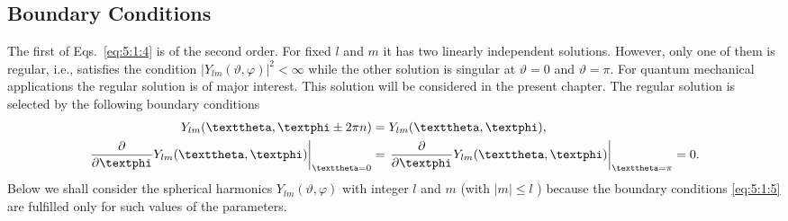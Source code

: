 \subsection{Boundary Conditions}\label{sec:5.1.3}
The first of Eqs.~\eqref{eq:5:1:4} is of the second order. For fixed $l$ and $m$ it has two linearly independent solutions. However, only one of them is regular, i.e., satisfies the condition $\left|Y_{l m}(\vartheta, \varphi)\right|^{2}<\infty$ while the other solution is singular at $\vartheta=0$ and $\vartheta=\pi$. For quantum mechanical applications the regular solution is of major interest. This solution will be considered in the present chapter. The regular solution is selected by the following boundary conditions
\begin{align}
Y_{l m}(\vartheta, \varphi \pm 2 \pi n) & =Y_{l m}(\vartheta, \varphi),  \notag\\
\left.\frac{\partial}{\partial \varphi} Y_{l m}(\vartheta, \varphi)\right|_{\vartheta=0} & =\left.\frac{\partial}{\partial \varphi} Y_{l m}(\vartheta, \varphi)\right|_{\vartheta=\pi}=0 . \label{eq:5:1:5}
\end{align}
Below we shall consider the spherical harmonics $Y_{l m}(\vartheta, \varphi)$ with integer $l$ and $m$ (with $|m| \leq l$ ) because the boundary conditions \eqref{eq:5:1:5} are fulfilled only for such values of the parameters.

